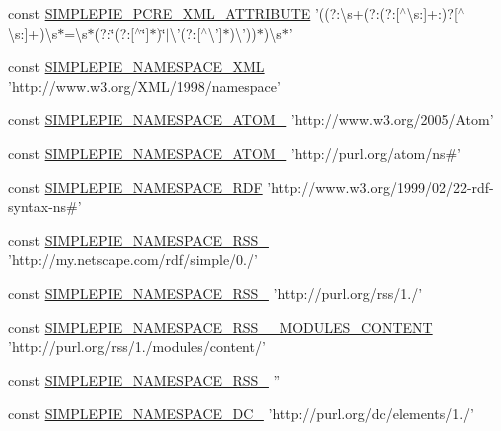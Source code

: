 \begin{DoxyCompactItemize}
\item 
const \hyperlink{simplepie_8inc_aef3cca39609e207451efeffc1364a546}{S\-I\-M\-P\-L\-E\-P\-I\-E\-\_\-\-P\-C\-R\-E\-\_\-\-X\-M\-L\-\_\-\-A\-T\-T\-R\-I\-B\-U\-T\-E} '((?\-:\textbackslash{}s+(?\-:(?\-:\mbox{[}$^\wedge$\textbackslash{}s\-:\mbox{]}+\-:)?\mbox{[}$^\wedge$\textbackslash{}s\-:\mbox{]}+)\textbackslash{}s$\ast$=\textbackslash{}s$\ast$(?\-:\char`\"{}(?\-:\mbox{[}$^\wedge$\char`\"{}\mbox{]}$\ast$)\char`\"{}$|$\textbackslash{}'(?\-:\mbox{[}$^\wedge$\textbackslash{}'\mbox{]}$\ast$)\textbackslash{}'))$\ast$)\textbackslash{}s$\ast$'
\item 
const \hyperlink{simplepie_8inc_a83ec91d7062bc133dee93483957391da}{S\-I\-M\-P\-L\-E\-P\-I\-E\-\_\-\-N\-A\-M\-E\-S\-P\-A\-C\-E\-\_\-\-X\-M\-L} 'http\-://www.\-w3.\-org/X\-M\-L/1998/namespace'
\item 
const \hyperlink{simplepie_8inc_a33c3585ac10f95c67ca7e797f5625707}{S\-I\-M\-P\-L\-E\-P\-I\-E\-\_\-\-N\-A\-M\-E\-S\-P\-A\-C\-E\-\_\-\-A\-T\-O\-M\-\_} 'http\-://www.\-w3.\-org/2005/Atom'
\item 
const \hyperlink{simplepie_8inc_a9104e654d49e0eb26fe37583cc20e52f}{S\-I\-M\-P\-L\-E\-P\-I\-E\-\_\-\-N\-A\-M\-E\-S\-P\-A\-C\-E\-\_\-\-A\-T\-O\-M\-\_} 'http\-://purl.\-org/atom/ns\#'
\item 
const \hyperlink{simplepie_8inc_af3206ab9444e30f971a3b6d03456b8a3}{S\-I\-M\-P\-L\-E\-P\-I\-E\-\_\-\-N\-A\-M\-E\-S\-P\-A\-C\-E\-\_\-\-R\-D\-F} 'http\-://www.\-w3.\-org/1999/02/22-\/rdf-\/syntax-\/ns\#'
\item 
const \hyperlink{simplepie_8inc_a52b603e52d563c0a3cc05018f405e819}{S\-I\-M\-P\-L\-E\-P\-I\-E\-\_\-\-N\-A\-M\-E\-S\-P\-A\-C\-E\-\_\-\-R\-S\-S\-\_} 'http\-://my.\-netscape.\-com/rdf/simple/0./'
\item 
const \hyperlink{simplepie_8inc_af30963669d3f18d727407a20357f7de5}{S\-I\-M\-P\-L\-E\-P\-I\-E\-\_\-\-N\-A\-M\-E\-S\-P\-A\-C\-E\-\_\-\-R\-S\-S\-\_} 'http\-://purl.\-org/rss/1./'
\item 
const \hyperlink{simplepie_8inc_ac5ae4b6b9f8ea48bfa9d983ba53f9b4d}{S\-I\-M\-P\-L\-E\-P\-I\-E\-\_\-\-N\-A\-M\-E\-S\-P\-A\-C\-E\-\_\-\-R\-S\-S\-\_\-\_\-\-M\-O\-D\-U\-L\-E\-S\-\_\-\-C\-O\-N\-T\-E\-N\-T} 'http\-://purl.\-org/rss/1./modules/content/'
\item 
const \hyperlink{simplepie_8inc_ab62c764df936ea8225b833dfb298772e}{S\-I\-M\-P\-L\-E\-P\-I\-E\-\_\-\-N\-A\-M\-E\-S\-P\-A\-C\-E\-\_\-\-R\-S\-S\-\_} ''
\item 
const \hyperlink{simplepie_8inc_a7b8c374b79ce366db33428ca42685a90}{S\-I\-M\-P\-L\-E\-P\-I\-E\-\_\-\-N\-A\-M\-E\-S\-P\-A\-C\-E\-\_\-\-D\-C\-\_} 'http\-://purl.\-org/dc/elements/1./'

\end{DoxyCompactItemize}
